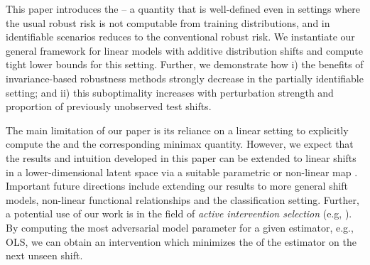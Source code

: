 This paper introduces the
\idRRs – a quantity that is well-defined
even in settings where the usual robust risk is not computable from training distributions,
and in identifiable scenarios \citep{rothenhausler2021anchor,shen2023causalityoriented} reduces to the conventional robust risk.
We instantiate our general framework for linear models with additive distribution shifts and compute tight lower bounds for this setting.
Further, we demonstrate how i) the benefits of invariance-based robustness methods strongly decrease in the partially identifiable setting; and ii) this suboptimality increases with perturbation strength and proportion of previously unobserved test shifts.

The main limitation of our paper is its reliance on a linear setting to explicitly compute the \idRRs and the corresponding minimax quantity. However, we expect that the results and intuition developed in this paper  can be extended to linear shifts in a 
lower-dimensional latent space via a suitable parametric or non-linear map \citep{thams2022evaluating, buchholz2024learning}. Important future directions include extending our results to more general shift models, non-linear functional relationships and the classification setting. 
Further, a potential use of our work is in the field of \emph{active intervention selection} (e.g, \citep{zhang2023active, gamella2020active}). By computing the most adversarial model parameter for a given estimator, e.g., OLS, we can obtain an intervention which minimizes the \idRRs of the estimator on the next unseen shift. 
